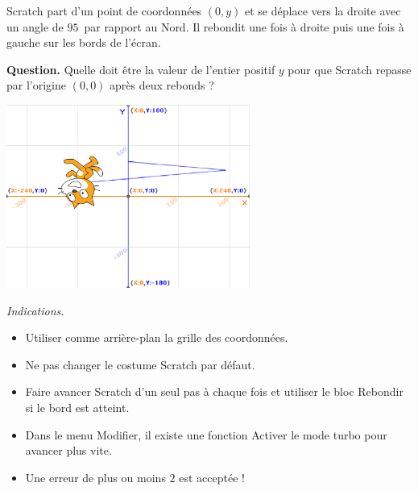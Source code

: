 \documentclass[class=report,crop=false, 12pt]{standalone}
\begin{document}
\begin{enigme}

Scratch part d'un point de coordonnées $(0,y)$ et se déplace vers la droite avec un angle de $95$\textdegree\ par rapport au Nord. Il rebondit une fois à droite puis une fois à gauche sur les bords de l'écran.


\textbf{Question.} Quelle doit être la valeur de l'entier positif $y$ pour que Scratch repasse par l'origine $(0,0)$ après deux rebonds ?

\bigskip

\begin{center}
  \includegraphics[width=0.6\textwidth]{ecran-03-eg2}   
\end{center}

\bigskip

\emph{Indications.} 
\begin{itemize}
  \item Utiliser comme arrière-plan la grille des coordonnées.
  
  \item Ne pas changer le costume Scratch par défaut.
  
  \item Faire avancer Scratch d'un seul pas à chaque fois et utiliser le bloc \og{}Rebondir si le bord est atteint\fg{}.
  
  \item Dans le menu \og{}Modifier\fg{}, il existe une fonction \og{}Activer le mode turbo\fg{} pour avancer plus vite.
  
  \item Une erreur de plus ou moins $2$ est acceptée !
\end{itemize}



\end{enigme}
\end{document}
